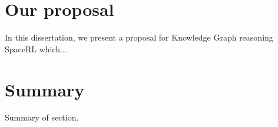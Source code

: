 \section{Our proposal}\label{sec:moti-proposal}
In this dissertation, we present a proposal for Knowledge Graph reasoning SpaceRL which...





\section{Summary}\label{sec:moti-summary}
Summary of section.
